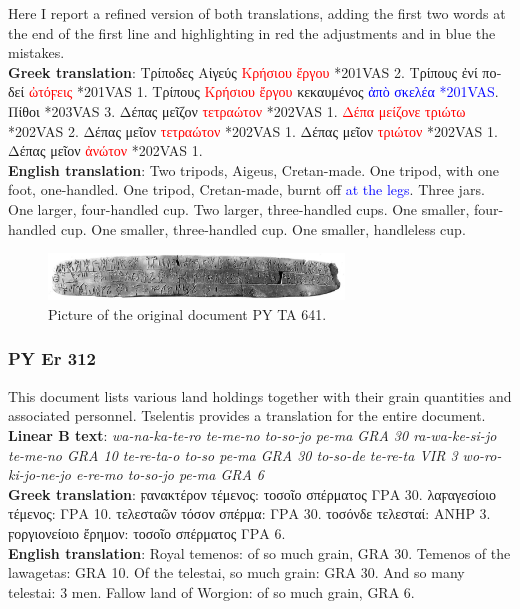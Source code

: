 Here I report a refined version of both translations, adding the first two words at the end of the first line and highlighting in red the adjustments and in blue the mistakes. \\
\textbf{Greek translation}: \textgreek{Τρίποδες Αἰγεύς} \textcolor{red}{\textgreek{Κρήσιου ἔργου}} \textgreek{*201VAS 2. Τρίπους} \textgreek{ἐνί} \textgreek{ποδεί} \textcolor{red}{\textgreek{ὠτόϝεις}} \textgreek{*201VAS 1. Τρίπους} \textcolor{red}{\textgreek{Κρήσιου ἔργου}} \textgreek{κεκαυμένος} \textcolor{blue}{\textgreek{ἀπὸ σκελέα *201VAS}}\textgreek{. Πίθοι *203VAS 3. Δέπας μεῖζον} \textcolor{red}{\textgreek{τετραώτον}} \textgreek{*202VAS 1.} \textcolor{red}{\textgreek{Δέπα μείζονε τριώτω}} \textgreek{*202VAS 2. Δέπας μεῖον} \textcolor{red}{\textgreek{τετραώτον}} \textgreek{*202VAS 1. Δέπας μεῖον} \textcolor{red}{\textgreek{τριώτον}} \textgreek{*202VAS 1. Δέπας μεῖον} \textcolor{red}{\textgreek{ἀνώτον}} \textgreek{*202VAS 1.} \\
\textbf{English translation}: Two tripods, Aigeus, Cretan-made. One tripod, with one foot, one-handled. One tripod, Cretan-made, burnt off \textcolor{blue}{at the legs}. Three jars. One larger, four-handled cup. Two larger, three-handled cups. One smaller, four-handled cup. One smaller, three-handled cup. One smaller, handleless cup.


\begin{figure}[H]
  \centering
  \includegraphics[width=0.7\textwidth]{Images/5344.png} %
  \caption{Picture of the original document PY TA 641.}
  \label{fig:doc8}
\end{figure}


\subsubsection{PY Er 312} \label{doc:pyer312}
This document lists various land holdings together with their grain quantities and associated personnel.
Tselentis provides a translation for the entire document.  \\
\textbf{Linear B text}: \textit{wa-na-ka-te-ro te-me-no to-so-jo pe-ma GRA 30 ra-wa-ke-si-jo te-me-no GRA 10 te-re-ta-o to-so pe-ma GRA 30 to-so-de te-re-ta VIR 3 wo-ro-ki-jo-ne-jo e-re-mo to-so-jo pe-ma GRA 6} \\
\textbf{Greek translation}: \textgreek{ϝανακτέρον τέμενος: τοσοῖο σπέρματος ΓΡΑ 30. λαϝαγεσίοιο τέμενος: ΓΡΑ 10. τελεσταῶν τόσον σπέρμα: ΓΡΑ 30. τοσόνδε τελεσταί: ΑΝΗΡ 3. ϝοργιονείοιο ἔρημον: τοσοῖο σπέρματος ΓΡΑ 6.} \\
\textbf{English translation}: Royal temenos: of so much grain, GRA 30. Temenos of the lawagetas: GRA 10. Of the telestai, so much grain: GRA 30. And so many telestai: 3 men. Fallow land of Worgion: of so much grain, GRA 6.

